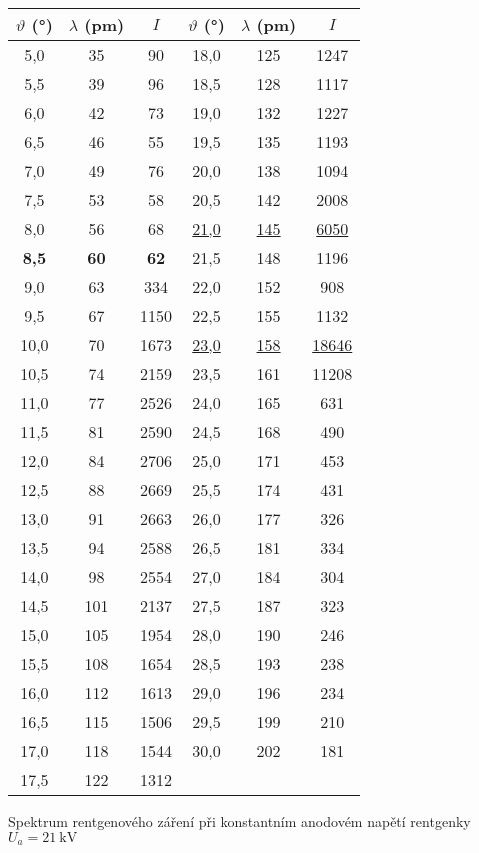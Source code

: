 \begin{tabulka}[p]
\centering
\begin{tabular}{ccc|ccc}
$\vartheta$ (\si{\degree}) & $\lambda$ (\si{\pico\metre}) & $I$ & $\vartheta$ (\si{\degree}) & $\lambda$ (\si{\pico\metre}) & $I$   \\ \hline
5,0 & 35 & 90 & 18,0 & 125 & 1247 \\ 
5,5 & 39 & 96 & 18,5 & 128 & 1117 \\ 
6,0 & 42 & 73 & 19,0 & 132 & 1227 \\ 
6,5 & 46 & 55 & 19,5 & 135 & 1193 \\ 
7,0 & 49 & 76 & 20,0 & 138 & 1094 \\ 
7,5 & 53 & 58 & 20,5 & 142 & 2008 \\ 
8,0 & 56 & 68 & \underline{21,0} & \underline{145} & \underline{6050} \\ 
\textbf{8,5} & \textbf{60} & \textbf{62} & 21,5 & 148 & 1196 \\ 
9,0 & 63 & 334 & 22,0 & 152 & 908 \\ 
9,5 & 67 & 1150 & 22,5 & 155 & 1132 \\ 
10,0 & 70 & 1673 & \underline{23,0} & \underline{158} & \underline{18646} \\ 
10,5 & 74 & 2159 & 23,5 & 161 & 11208 \\ 
11,0 & 77 & 2526 & 24,0 & 165 & 631 \\ 
11,5 & 81 & 2590 & 24,5 & 168 & 490 \\ 
12,0 & 84 & 2706 & 25,0 & 171 & 453 \\ 
12,5 & 88 & 2669 & 25,5 & 174 & 431 \\ 
13,0 & 91 & 2663 & 26,0 & 177 & 326 \\ 
13,5 & 94 & 2588 & 26,5 & 181 & 334 \\ 
14,0 & 98 & 2554 & 27,0 & 184 & 304 \\ 
14,5 & 101 & 2137 & 27,5 & 187 & 323 \\ 
15,0 & 105 & 1954 & 28,0 & 190 & 246 \\ 
15,5 & 108 & 1654 & 28,5 & 193 & 238 \\ 
16,0 & 112 & 1613 & 29,0 & 196 & 234 \\ 
16,5 & 115 & 1506 & 29,5 & 199 & 210 \\ 
17,0 & 118 & 1544 & 30,0 & 202 & 181 \\ 
17,5 & 122 & 1312 &  &  &  \\ 
\end{tabular}
\caption{Spektrum rentgenového záření při konstantním anodovém napětí rentgenky $U_a=\SI{21}{\kV}$}
\label{t:spektrum}
\end{tabulka}


